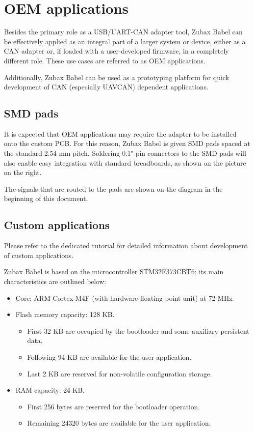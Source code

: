 \documentclass{zubaxdoc}
\begin{document}
\chapter{OEM applications}

Besides the primary role as a USB/UART-CAN adapter tool, Zubax Babel can be effectively applied as an integral part of a larger system or device, either as a CAN adapter or, if loaded with a user-developed firmware, in a completely different role. These use cases are referred to as OEM applications.

Additionally, Zubax Babel can be used as a prototyping platform for quick development of CAN (especially UAVCAN) dependent applications.

\section{SMD pads}

It is expected that OEM applications may require the adapter to be installed onto the custom PCB. For this reason, Zubax Babel is given SMD pads spaced at the standard 2.54 mm pitch. Soldering 0.1" pin connectors to the SMD pads will also enable easy integration with standard breadboards, as shown on the picture on the right.

The signals that are routed to the pads are shown on the diagram in the beginning of this document.

\section{Custom applications}

Please refer to the dedicated tutorial for detailed information about development of custom applications.

Zubax Babel is based on the microcontroller STM32F373CBT6; its main characteristics are outlined below:

\begin{itemize}
\item Core: ARM Cortex-M4F (with hardware floating point unit) at 72 MHz.
\item Flash memory capacity: 128 KB.
\begin{itemize}
\item First 32 KB are occupied by the bootloader and some auxiliary persistent data.
\item Following 94 KB are available for the user application.
\item Last 2 KB are reserved for non-volatile configuration storage.
\end{itemize}
\item RAM capacity: 24 KB.
\begin{itemize}
\item First 256 bytes are reserved for the bootloader operation.
\item Remaining 24320 bytes are available for the user application.
\end{itemize}
\end{itemize}
\end{document}
